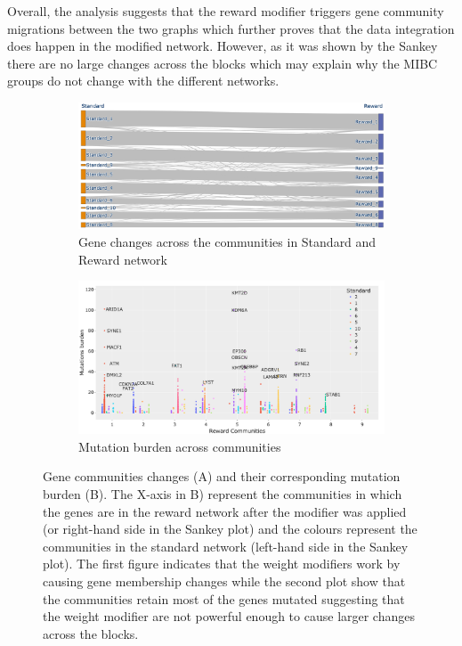 Overall, the analysis suggests that the reward modifier triggers gene community migrations between the two graphs which further proves that the data integration does happen in the modified network. However, as it was shown by the Sankey there are no large changes across the blocks which may explain why the MIBC groups do not change with the different networks.

\begin{figure}[!htb]
    \centering
    \begin{subfigure}[!t]{1.0\textwidth}
        \includegraphics[width=\textwidth,keepaspectratio]{Sections/Network_I/Resources/P0/Comms/Sky_Comm_Comp_4K_v3.png}
        \caption{Gene changes across the communities in Standard and Reward network}
        \label{fig:N_I:p0_chg_sankey}
    \end{subfigure}
    \begin{subfigure}[!t]{1.0\textwidth}
        \includegraphics[width=\textwidth,keepaspectratio]{Sections/Network_I/Resources/P0/Comms/Mut_Comm_Comp_4K_v3.png}
        \caption{Mutation burden across communities}
        \label{fig:N_I:p0_chg_mut}
    \end{subfigure}
    \caption[Gene migrations between communities]{Gene communities changes (A) and their corresponding mutation burden (B). The X-axis in B) represent the communities in which the genes are in the reward network after the modifier was applied (or right-hand side in the Sankey plot) and the colours represent the communities in the standard network (left-hand side in the Sankey plot). The first figure indicates that the weight modifiers work by causing gene membership changes while the second plot show that the communities retain most of the genes mutated suggesting that the weight modifier are not powerful enough to cause larger changes across the blocks. }
    \label{fig:N_I:p0_comm_chgs_1}
\end{figure}



